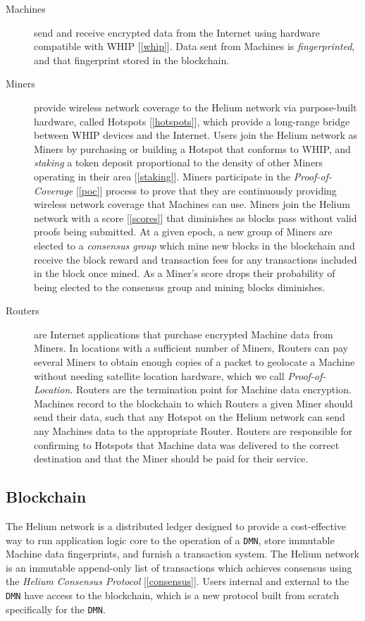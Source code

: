 \documentclass[10pt, nonatbib, nocopyrightspace, reprint]{sigplanconf}
\newcommand{\secref}[1]{[\autoref{#1}]}
\begin{document}
\begin{description}
    \item [Machines] send and receive encrypted data from the Internet using hardware compatible with WHIP \secref{whip}. Data sent from Machines is \emph{fingerprinted}, and that fingerprint stored in the blockchain.
    \item [Miners] provide wireless network coverage to the Helium network via purpose-built hardware, called Hotspots \secref{hotspots}, which provide a long-range bridge between WHIP devices and the Internet. Users join the Helium network as Miners by purchasing or building a Hotspot that conforms to WHIP, and \emph{staking} a token deposit proportional to the density of other Miners operating in their area \secref{staking}. Miners participate in the \emph{Proof-of-Coverage} \secref{poc} process to prove that they are continuously providing wireless network coverage that Machines can use. Miners join the Helium network with a score \secref{scores} that diminishes as blocks pass without valid proofs being submitted. At a given epoch, a new group of Miners are elected to a \emph{consensus group} which mine new blocks in the blockchain and receive the block reward and transaction fees for any transactions included in the block once mined. As a Miner's score drops their probability of being elected to the consensus group and mining blocks diminishes.
    \item [Routers] are Internet applications that purchase encrypted Machine data from Miners. In locations with a sufficient number of Miners, Routers can pay several Miners to obtain enough copies of a packet to geolocate a Machine without needing satellite location hardware, which we call \emph{Proof-of-Location}.  Routers are the termination point for Machine data encryption. Machines record to the blockchain to which Routers a given Miner should send their data, such that any Hotspot on the Helium network can send any Machines data to the appropriate Router. Routers are responsible for confirming to Hotspots that Machine data was delivered to the correct destination and that the Miner should be paid for their service.
\end{description}

\subsection{Blockchain} \label{blockchain}

The Helium network is a distributed ledger designed to provide a cost-effective way to run application logic core to the operation of a \verb|DMN|, store immutable Machine data fingerprints, and furnish a transaction system. The Helium network is an immutable append-only list of transactions which achieves consensus using the \emph{Helium Consensus Protocol} \secref{consensus}. Users internal and external to the \verb|DMN| have access to the blockchain, which is a new protocol built from scratch specifically for the \verb|DMN|.
\end{document}
